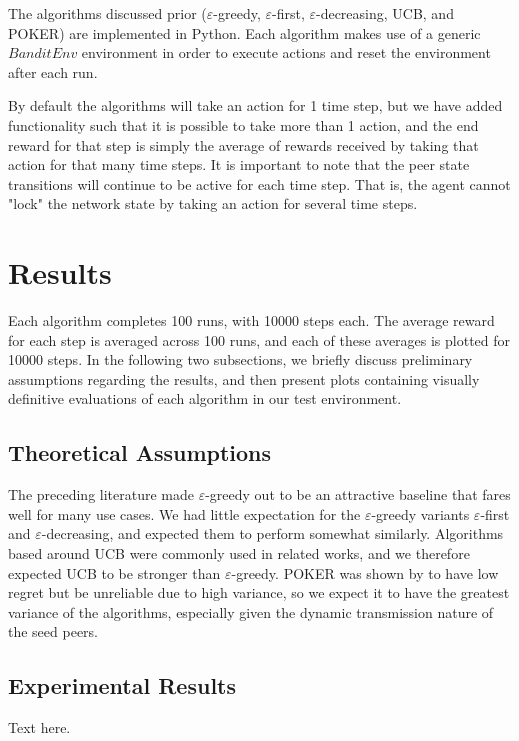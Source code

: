 \documentclass{article}
\begin{document}
The algorithms discussed prior ($\varepsilon$-greedy, $\varepsilon$-first, $\varepsilon$-decreasing, UCB, and POKER) are implemented in Python. Each algorithm makes use 
of a generic $BanditEnv$ environment in order to execute actions and reset the environment after each run. 

By default the algorithms will take an action for 1 time step, but we have added functionality such that it is possible to take more than 1 action, and the end reward 
for that step is simply the average of rewards received by taking that action for that many time steps. It is important to note that the peer state transitions will 
continue to be active for each time step. That is, the agent cannot "lock" the network state by taking an action for several time steps. 

\section{Results}
Each algorithm completes 100 runs, with 10000 steps each. The average reward for each step is averaged across 100 runs, and each of these averages is plotted for 10000 
steps. In the following two subsections, we briefly discuss preliminary assumptions regarding the results, and then present plots containing visually definitive evaluations 
of each algorithm in our test environment.

\subsection{Theoretical Assumptions} 
The preceding literature made $\varepsilon$-greedy out to be an attractive baseline that fares well for many use cases. We had little expectation for the $\varepsilon$-greedy 
variants $\varepsilon$-first and $\varepsilon$-decreasing, and expected them to perform somewhat similarly. Algorithms based around UCB were commonly used in related works, 
and we therefore expected UCB to be stronger than $\varepsilon$-greedy. POKER was shown by \cite{muMAB_wireless} to have low regret but be unreliable due to high variance, 
so we expect it to have the greatest variance of the algorithms, especially given the dynamic transmission nature of the seed peers.

\subsection{Experimental Results} 
Text here.
\end{document}
